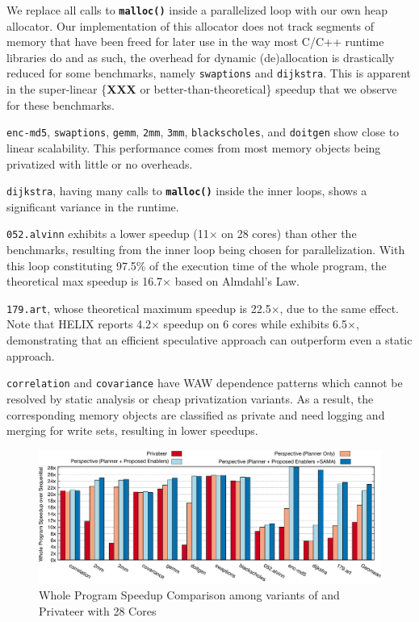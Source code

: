 We replace all calls to \texttt{\textbf{malloc()}} inside a parallelized
loop with our own heap allocator. Our implementation of this allocator
does not track segments of memory that have been freed for later use in the
way most C/C++ runtime libraries do and as such, the overhead for dynamic
(de)allocation is drastically reduced for some benchmarks, namely
\texttt{swaptions} and \texttt{dijkstra}. This is apparent in the
super-linear \{\textbf{XXX} or better-than-theoretical\} speedup that we
observe for these benchmarks.

\texttt{enc-md5}, \texttt{swaptions}, \texttt{gemm}, \texttt{2mm},
\texttt{3mm}, \texttt{blackscholes}, and \texttt{doitgen} show
close to linear scalability. This performance comes from most memory
objects being privatized with little or no overheads.

\texttt{dijkstra}, having many calls to \texttt{\textbf{malloc()}}
inside the inner loops, shows a significant variance in
the runtime.

\texttt{052.alvinn} exhibits a lower speedup (11$\times$ on 28
cores) than other the benchmarks, resulting from the inner loop
being chosen for parallelization. With this loop constituting 97.5\% of the
execution time of the whole program, the theoretical max speedup is 16.7$\times$
based on Almdahl's Law.

\texttt{179.art}, whose theoretical maximum speedup is 22.5$\times$, due to
the same effect. Note that HELIX\cite{simone:12:cgo} reports 4.2$\times$ speedup
on 6 cores while \name exhibits 6.5$\times$, demonstrating that an efficient
speculative approach can outperform even a static approach.

\texttt{correlation} and \texttt{covariance} have WAW
dependence patterns which cannot be resolved by static analysis or cheap
privatization variants. As a result, the corresponding memory objects are
classified as private and need logging and merging for write sets,
resulting in lower speedups.

\begin{figure}[ht]
  \includegraphics[width=\textwidth]{figures/compare-privateer}
  \caption{Whole Program Speedup Comparison among variants of \name and Privateer with 28 Cores}
  \label{fig:speedup-compare}
\end{figure}

